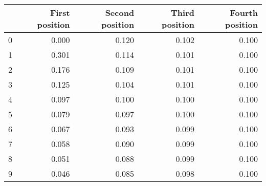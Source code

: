 \begin{tabular}{lrrrr}
\toprule
 & First position & Second position & Third position & Fourth position \\
\midrule
0 & 0.000 & 0.120 & 0.102 & 0.100 \\
1 & 0.301 & 0.114 & 0.101 & 0.100 \\
2 & 0.176 & 0.109 & 0.101 & 0.100 \\
3 & 0.125 & 0.104 & 0.101 & 0.100 \\
4 & 0.097 & 0.100 & 0.100 & 0.100 \\
5 & 0.079 & 0.097 & 0.100 & 0.100 \\
6 & 0.067 & 0.093 & 0.099 & 0.100 \\
7 & 0.058 & 0.090 & 0.099 & 0.100 \\
8 & 0.051 & 0.088 & 0.099 & 0.100 \\
9 & 0.046 & 0.085 & 0.098 & 0.100 \\
\bottomrule
\end{tabular}
